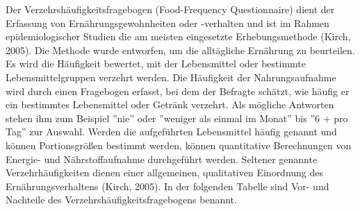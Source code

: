 Der Verzehrshäufigkeitsfragebogen (Food-Frequency Questionnaire) dient der Erfassung von Ernährungsgewohnheiten oder -verhalten und ist im Rahmen epidemiologischer Studien die am meisten eingesetzte Erhebungsmethode (Kirch, 2005). 
Die Methode wurde entworfen, um die alltägliche Ernährung zu beurteilen. Es wird die Häufigkeit bewertet, mit der Lebensmittel oder bestimmte Lebensmittelgruppen verzehrt werden. Die Häufigkeit der Nahrungsaufnahme wird durch einen Fragebogen erfasst, bei dem der Befragte schätzt, wie häufig er ein bestimmtes Lebensmittel oder Getränk verzehrt. Als mögliche Antworten stehen ihm zum Beispiel ''nie'' oder ''weniger als einmal im Monat'' bis ''6 + pro Tag'' zur Auswahl. Werden die aufgeführten Lebensmittel häufig genannt und können Portionsgrößen bestimmt werden, können quantitative Berechnungen von Energie- und Nährstoffaufnahme durchgeführt werden. Seltener genannte Verzehrhäufigkeiten dienen einer allgemeinen, qualitativen Einordnung des Ernährungsverhaltens (Kirch, 2005). 
In der folgenden Tabelle sind Vor- und Nachteile des Verzehrshäufigkeitsfragebogens benannt.






